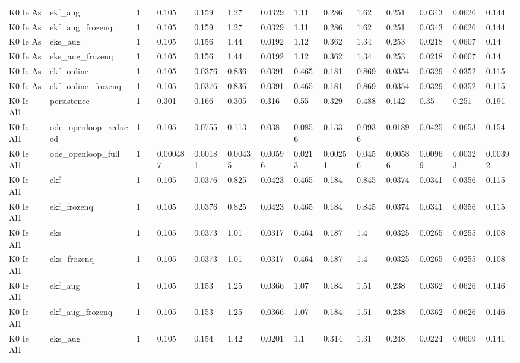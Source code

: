 \begin{table}[t]
\begin{tabular}{lllllllllllllll}
K0 Ie As & ekf\_aug & 1 &  & 0.105 & 0.159 & 1.27 & 0.0329 & 1.11 & 0.286 & 1.62 & 0.251 & 0.0343 & 0.0626 & 0.144 \\
K0 Ie As & ekf\_aug\_frozenq & 1 &  & 0.105 & 0.159 & 1.27 & 0.0329 & 1.11 & 0.286 & 1.62 & 0.251 & 0.0343 & 0.0626 & 0.144 \\
K0 Ie As & eks\_aug & 1 &  & 0.105 & 0.156 & 1.44 & 0.0192 & 1.12 & 0.362 & 1.34 & 0.253 & 0.0218 & 0.0607 & 0.14 \\
K0 Ie As & eks\_aug\_frozenq & 1 &  & 0.105 & 0.156 & 1.44 & 0.0192 & 1.12 & 0.362 & 1.34 & 0.253 & 0.0218 & 0.0607 & 0.14 \\
K0 Ie As & ekf\_online & 1 &  & 0.105 & 0.0376 & 0.836 & 0.0391 & 0.465 & 0.181 & 0.869 & 0.0354 & 0.0329 & 0.0352 & 0.115 \\
K0 Ie As & ekf\_online\_frozenq & 1 &  & 0.105 & 0.0376 & 0.836 & 0.0391 & 0.465 & 0.181 & 0.869 & 0.0354 & 0.0329 & 0.0352 & 0.115 \\
K0 Ie Al1 & persistence & 1 &  & 0.301 & 0.166 & 0.305 & 0.316 & 0.55 & 0.329 & 0.488 & 0.142 & 0.35 & 0.251 & 0.191 \\
K0 Ie Al1 & ode\_openloop\_reduced & 1 &  & 0.105 & 0.0755 & 0.113 & 0.038 & 0.0856 & 0.133 & 0.0936 & 0.0189 & 0.0425 & 0.0653 & 0.154 \\
K0 Ie Al1 & ode\_openloop\_full & 1 &  & 0.000487 & 0.00181 & 0.00435 & 0.00596 & 0.0213 & 0.00251 & 0.0456 & 0.00586 & 0.00969 & 0.00323 & 0.00392 \\
K0 Ie Al1 & ekf & 1 &  & 0.105 & 0.0376 & 0.825 & 0.0423 & 0.465 & 0.184 & 0.845 & 0.0374 & 0.0341 & 0.0356 & 0.115 \\
K0 Ie Al1 & ekf\_frozenq & 1 &  & 0.105 & 0.0376 & 0.825 & 0.0423 & 0.465 & 0.184 & 0.845 & 0.0374 & 0.0341 & 0.0356 & 0.115 \\
K0 Ie Al1 & eks & 1 &  & 0.105 & 0.0373 & 1.01 & 0.0317 & 0.464 & 0.187 & 1.4 & 0.0325 & 0.0265 & 0.0255 & 0.108 \\
K0 Ie Al1 & eks\_frozenq & 1 &  & 0.105 & 0.0373 & 1.01 & 0.0317 & 0.464 & 0.187 & 1.4 & 0.0325 & 0.0265 & 0.0255 & 0.108 \\
K0 Ie Al1 & ekf\_aug & 1 &  & 0.105 & 0.153 & 1.25 & 0.0366 & 1.07 & 0.184 & 1.51 & 0.238 & 0.0362 & 0.0626 & 0.146 \\
K0 Ie Al1 & ekf\_aug\_frozenq & 1 &  & 0.105 & 0.153 & 1.25 & 0.0366 & 1.07 & 0.184 & 1.51 & 0.238 & 0.0362 & 0.0626 & 0.146 \\
K0 Ie Al1 & eks\_aug & 1 &  & 0.105 & 0.154 & 1.42 & 0.0201 & 1.1 & 0.314 & 1.31 & 0.248 & 0.0224 & 0.0609 & 0.141 \\

\end{tabular}
\end{table}
